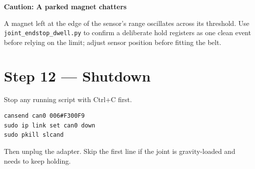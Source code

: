 \documentclass[11pt,letterpaper]{article}
\newenvironment{caution}[1]{%
    \par\addvspace{8pt}%
    \noindent{\color{cautionred}\rule{\linewidth}{0.8pt}}\par\vspace{2pt}
    \noindent\textbf{\color{cautionred}Caution: #1}\par\vspace{2pt}
}{%
    \par\vspace{2pt}\noindent{\color{cautionred}\rule{\linewidth}{0.4pt}}%
    \par\addvspace{8pt}%
}
\begin{document}
\begin{caution}{A parked magnet chatters}
A magnet left at the edge of the sensor's range oscillates across its threshold. Use
\texttt{joint\_endstop\_dwell.py} to confirm a deliberate hold registers as one clean
event before relying on the limit; adjust sensor position before fitting the belt.
\end{caution}

\section*{Step 12 --- Shutdown}

Stop any running script with Ctrl+C first.

\begin{lstlisting}
cansend can0 006#F300F9
sudo ip link set can0 down
sudo pkill slcand
\end{lstlisting}

Then unplug the adapter. Skip the first line if the joint is gravity-loaded and
needs to keep holding.
\end{document}
